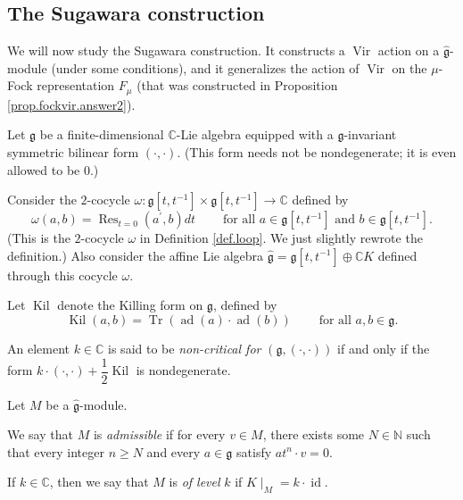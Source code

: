 \documentclass[etingof-lie.tex]{subfiles}
\begin{document}
\subsection{The Sugawara construction}

We will now study the Sugawara construction. It constructs a
$\operatorname*{Vir}$ action on a $\widehat{\mathfrak{g}}$-module (under some
conditions), and it generalizes the action of $\operatorname*{Vir}$ on the
$\mu$-Fock representation $F_{\mu}$ (that was constructed in Proposition
\ref{prop.fockvir.answer2}).

\begin{definition}
\label{def.sugawara}Let $\mathfrak{g}$ be a finite-dimensional $\mathbb{C}%
$-Lie algebra equipped with a $\mathfrak{g}$-invariant symmetric bilinear form
$\left(  \cdot,\cdot\right)  $. (This form needs not be nondegenerate; it is
even allowed to be $0$.)

Consider the $2$-cocycle $\omega:\mathfrak{g}\left[  t,t^{-1}\right]
\times\mathfrak{g}\left[  t,t^{-1}\right]  \rightarrow\mathbb{C}$ defined by%
\[
\omega\left(  a,b\right)  =\operatorname*{Res}\nolimits_{t=0}\left(
a^{\prime},b\right)  dt\ \ \ \ \ \ \ \ \ \ \text{for all }a\in\mathfrak{g}%
\left[  t,t^{-1}\right]  \text{ and }b\in\mathfrak{g}\left[  t,t^{-1}\right]
.
\]
(This is the $2$-cocycle $\omega$ in Definition \ref{def.loop}. We just
slightly rewrote the definition.) Also consider the affine Lie algebra
$\widehat{\mathfrak{g}}=\mathfrak{g}\left[  t,t^{-1}\right]  \oplus
\mathbb{C}K$ defined through this cocycle $\omega$.

Let $\operatorname*{Kil}$ denote the Killing form on $\mathfrak{g}$, defined
by
\[
\operatorname*{Kil}\left(  a,b\right)  =\operatorname*{Tr}\left(
\operatorname*{ad}\left(  a\right)  \cdot\operatorname*{ad}\left(  b\right)
\right)  \ \ \ \ \ \ \ \ \ \ \text{for all }a,b\in\mathfrak{g}.
\]


An element $k\in\mathbb{C}$ is said to be \textit{non-critical for }$\left(
\mathfrak{g},\left(  \cdot,\cdot\right)  \right)  $ if and only if the form
$k\cdot\left(  \cdot,\cdot\right)  +\dfrac{1}{2}\operatorname*{Kil}$ is nondegenerate.
\end{definition}

\begin{definition}
\label{def.sugawara.M}Let $M$ be a $\widehat{\mathfrak{g}}$-module.

We say that $M$ is \textit{admissible} if for every $v\in M$, there exists
some $N\in\mathbb{N}$ such that every integer $n\geq N$ and every
$a\in\mathfrak{g}$ satisfy $at^{n}\cdot v=0$.

If $k\in\mathbb{C}$, then we say that $M$ is \textit{of level }$k$ if
$K\mid_{M}=k\cdot\operatorname*{id}$.
\end{definition}
\end{document}
